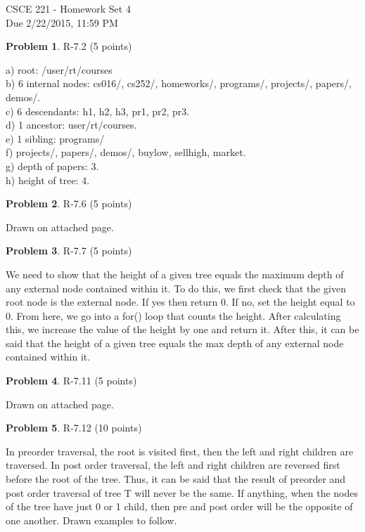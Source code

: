 \documentclass[12pt]{report}
\theoremstyle{definition}
\newtheorem{problem}{Problem}
\begin{document}
\vspace*{-15mm}
\begin{center}
{\large
				CSCE 221 - Homework Set 4 \\
				Due 2/22/2015, 11:59 PM}
\end{center}

\begin{problem} 	R-7.2 (5 points) 		
\end{problem}
				a) root: /user/rt/courses \\
				b) 6 internal nodes: cs016/, cs252/, homeworks/, programs/, projects/, papers/, demos/. \\
				c) 6 descendants: h1, h2, h3, pr1, pr2, pr3. \\
				d) 1 ancestor: user/rt/courses. \\
				e) 1 sibling: programs/ \\
				f) projects/, papers/, demos/, buylow, sellhigh, market. \\
				g) depth of papers: 3. \\
				h) height of tree: 4.
				
\begin{problem} 	R-7.6 (5 points) 		
\end{problem}
				Drawn on attached page.
				
\begin{problem} 	R-7.7 (5 points) 		
\end{problem}
				We need to show that the height of a given tree equals the maximum depth of any external 				node contained within it. To do this, we first check that the given root node is the external 					node. If yes then return 0. If no, set the height equal to 0. From here, we go into a for() loop 				that counts the height. After calculating this, we increase the value of the height by one and 				return it. After this, it can be said that the height of a given tree equals the max depth of any 				external node contained within it.

\begin{problem} 	R-7.11 (5 points) 		
\end{problem}
				Drawn on attached page.

\begin{problem} 	R-7.12 (10 points) 		
\end{problem}
				In preorder traversal, the root is visited first, then the left and right children are traversed. In 				post order traversal, the left and right children are reversed first before the root of the tree. 				Thus, it can be said that the result of preorder and post order traversal of tree T will never be 				the same. If anything, when the nodes of the tree have just 0 or 1 child, then pre and post 				order will be the opposite of one another. Drawn examples to follow. 
					
\end{document}
